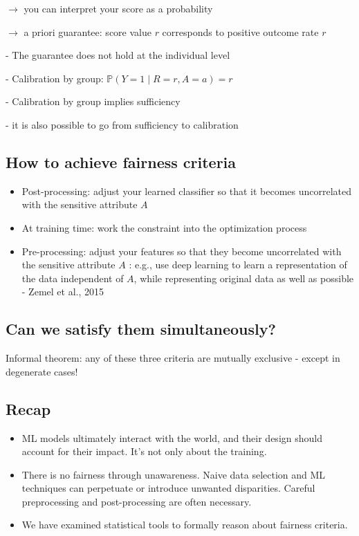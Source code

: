 $\rightarrow$ you can interpret your score as a probability

$\rightarrow$ a priori guarantee: score value $r$ corresponds to positive outcome rate $r$

- The guarantee does not hold at the individual level

- Calibration by group:
$
\mathbb{P}(Y=1 \mid R=r, A=a)=r
$

- Calibration by group implies sufficiency

- it is also possible to go from sufficiency to calibration

\subsection*{How to achieve fairness criteria}
\begin{itemize}
  \item Post-processing: adjust your learned classifier so that it becomes uncorrelated with the sensitive attribute $A$

  \item At training time: work the constraint into the optimization process

  \item Pre-processing: adjust your features so that they become uncorrelated with the sensitive attribute $A$ : e.g., use deep learning to learn a representation of the data independent of $A$, while representing original data as well as possible - Zemel et al., 2015
\end{itemize}



\subsection*{Can we satisfy them simultaneously?}
Informal theorem: any of these three criteria are mutually exclusive - except in degenerate cases!

\subsection*{Recap}
\begin{itemize}
  \item ML models ultimately interact with the world, and their design should account for their impact. It's not only about the training.

  \item There is no fairness through unawareness. Naive data selection and ML techniques can perpetuate or introduce unwanted disparities. Careful preprocessing and post-processing are often necessary.

  \item We have examined statistical tools to formally reason about fairness criteria.

\end{itemize}

